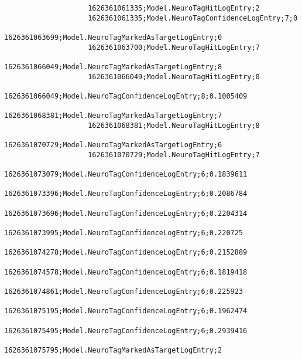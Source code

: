 \begin{lstlisting}
                    1626361061335;Model.NeuroTagHitLogEntry;2
                    1626361061335;Model.NeuroTagConfidenceLogEntry;7;0
                    1626361063699;Model.NeuroTagMarkedAsTargetLogEntry;0
                    1626361063700;Model.NeuroTagHitLogEntry;7
                    1626361066049;Model.NeuroTagMarkedAsTargetLogEntry;8
                    1626361066049;Model.NeuroTagHitLogEntry;0
                    1626361066049;Model.NeuroTagConfidenceLogEntry;8;0.1005409
                    1626361068381;Model.NeuroTagMarkedAsTargetLogEntry;7
                    1626361068381;Model.NeuroTagHitLogEntry;8
                    1626361070729;Model.NeuroTagMarkedAsTargetLogEntry;6
                    1626361070729;Model.NeuroTagHitLogEntry;7
                    1626361073079;Model.NeuroTagConfidenceLogEntry;6;0.1839611
                    1626361073396;Model.NeuroTagConfidenceLogEntry;6;0.2086784
                    1626361073696;Model.NeuroTagConfidenceLogEntry;6;0.2204314
                    1626361073995;Model.NeuroTagConfidenceLogEntry;6;0.220725
                    1626361074278;Model.NeuroTagConfidenceLogEntry;6;0.2152889
                    1626361074578;Model.NeuroTagConfidenceLogEntry;6;0.1819418
                    1626361074861;Model.NeuroTagConfidenceLogEntry;6;0.225923
                    1626361075195;Model.NeuroTagConfidenceLogEntry;6;0.1962474
                    1626361075495;Model.NeuroTagConfidenceLogEntry;6;0.2939416
                    1626361075795;Model.NeuroTagMarkedAsTargetLogEntry;2
                \end{lstlisting}
            

        \listoffigures %
        \listoftables %


     
    

    \clearpage\thispagestyle{empty}
    \eigen  %

